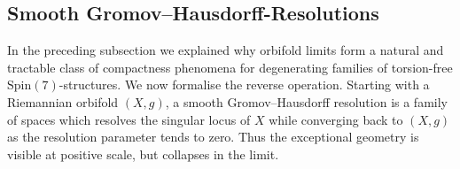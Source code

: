 \documentclass[psamsfonts]{amsart}
\theoremstyle{plain}
\theoremstyle{definition}{
\newtheorem{defi}{Definition}[section]
\newtheorem{ass}{Assumption}
\newtheorem*{nota}{Notation}}
\theoremstyle{remark}{
\newtheorem{rem}{Remark}
\newtheorem{ex}{Example}}
\theoremstyle{plain}{
\newtheorem{thm}{Theorem}[section]
\newtheorem{lem}{Lemma}[section]
\newtheorem{cor}{Corollary}[section]
\newtheorem{prop}{Proposition}[section]
\newtheorem{con}{Conjecture}[section]}
\newcommand{\m}[1]{{\mathrm{#1}}}
\begin{document}








\subsection{Smooth Gromov--Hausdorff-Resolutions}
\label{Smooth Gromov--Hausdorff-Resolutions}

In the preceding subsection we explained why orbifold limits form a natural and tractable class of compactness phenomena for degenerating families of torsion-free $\m{Spin}(7)$-structures. We now formalise the reverse operation. Starting with a Riemannian orbifold $(X,g)$, a smooth Gromov--Hausdorff resolution is a family of spaces which resolves the singular locus of $X$ while
converging back to $(X,g)$ as the resolution parameter tends to zero. Thus the exceptional geometry is visible at positive scale, but collapses in the limit.\\
\end{document}

